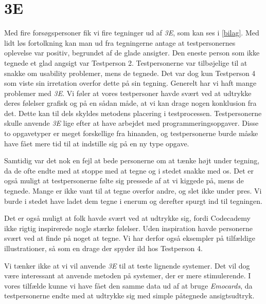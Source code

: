 \section{3E}\label{sec:eval3E}
Med fire forsøgspersoner fik vi fire tegninger ud af \textit{3E}, som kan ses i \cref{bilag}. Med lidt løs fortolkning kan man ud fra tegningerne antage at testpersonernes oplevelse var positiv, begrundet af de glade ansigter. Den eneste person som ikke tegnede et glad angsigt var Testperson 2. Testpersonerne var tilbøjelige til at snakke om usability problemer, mens de tegnede. Det var dog kun Testperson 4 som viste sin irretation overfor dette på sin tegning. 
Generelt har vi haft mange problemer med \textit{3E}. Vi føler at vores testpersoner havde svært ved at udtrykke deres følelser grafisk og på en sådan måde, at vi kan drage nogen konklusion fra det. Dette kan til dels skyldes metodens placering i testprocessen. Testpersonerne skulle anvende \textit{3E} lige efter at have arbejdet med programmeringsopgaver. Disse to opgavetyper er meget forskellige fra hinanden, og testpersonerne burde måske have fået mere tid til at indstille sig på en ny type opgave.   

Samtidig var det nok en fejl at bede personerne om at tænke højt under tegning, da de ofte endte med at stoppe med at tegne og i stedet snakke med os. Det er også muligt at testpersonerne følte sig pressede af at vi kiggede på, mens de tegnede. Mange er ikke vant til at tegne overfor andre, og slet ikke under pres. Vi burde i stedet have ladet dem tegne i enerum og derefter spurgt ind til tegningen. 

Det er også muligt at folk havde svært ved at udtrykke sig, fordi Codecademy ikke rigtig inspirerede nogle stærke følelser. Uden inspiration havde personerne svært ved at finde på noget at tegne. Vi har derfor også eksempler på tilfældige illustrationer, så som en drage der spyder ild hos Testperson 4. 

Vi tænker ikke at vi vil anvende \textit{3E} til at teste lignende systemer. Det vil dog være interessant at anvende metoden på systemer, der er mere stimulerende. I vores tilfælde kunne vi have fået den samme data ud af at bruge \textit{Emocards}, da testpersonerne endte med at udtrykke sig med simple påtegnede ansigtsudtryk.



